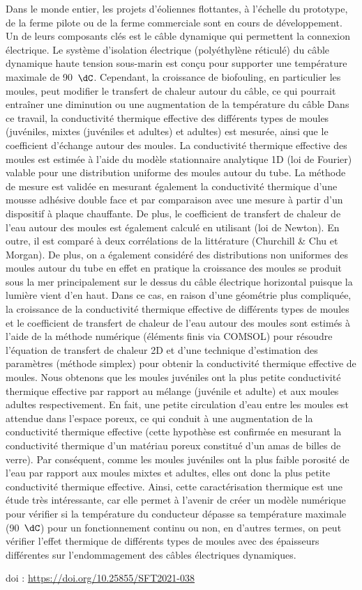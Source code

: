 {\normalsize
Dans le monde entier, les projets d'éoliennes flottantes, à l'échelle du prototype, de la ferme pilote ou de la ferme commerciale sont en cours de développement. Un de leurs composants clés est le câble dynamique qui permettent la connexion électrique. Le système d'isolation électrique (polyéthylène réticulé) du câble dynamique haute tension sous-marin est conçu pour supporter une température maximale de 90~$\dC$. Cependant, la croissance de biofouling, en particulier les moules, peut modifier le transfert de chaleur autour du câble, ce qui pourrait entraîner une diminution ou une augmentation de la température du câble Dans ce travail, la conductivité thermique effective des différents types de moules (juvéniles, mixtes (juvéniles et adultes) et adultes) est mesurée, ainsi que le coefficient d'échange autour des moules. La conductivité thermique effective des moules est estimée à l'aide du modèle stationnaire analytique 1D (loi de Fourier) valable pour une distribution uniforme des moules autour du tube. La méthode de mesure est validée en mesurant également la conductivité thermique d'une mousse adhésive double face et par comparaison avec une mesure à partir d'un dispositif à plaque chauffante. De plus, le coefficient de transfert de chaleur de l'eau autour des moules est également calculé en utilisant (loi de Newton). En outre, il est comparé à deux corrélations de la littérature (Churchill \& Chu et Morgan). De plus, on a également considéré des distributions non uniformes des moules autour du tube en effet en pratique la croissance des moules se produit sous la mer principalement sur le dessus du câble électrique horizontal puisque la lumière vient d'en haut. Dans ce cas, en raison d'une géométrie plus compliquée, la croissance de la conductivité thermique effective de différents types de moules et le coefficient de transfert de chaleur de l'eau autour des moules sont estimés à l'aide de la méthode numérique (éléments finis via COMSOL) pour résoudre l'équation de transfert de chaleur 2D et d'une technique d'estimation des paramètres (méthode simplex) pour obtenir la conductivité thermique effective de moules. Nous obtenons que les moules juvéniles ont la plus petite conductivité thermique effective par rapport au mélange (juvénile et adulte) et aux moules adultes respectivement. En fait, une petite circulation d'eau entre les moules est attendue dans l'espace poreux, ce qui conduit à une augmentation de la conductivité thermique effective (cette hypothèse est confirmée en mesurant la conductivité thermique d'un matériau poreux constitué d'un amas de billes de verre). Par conséquent, comme les moules juvéniles ont la plus faible porosité de l'eau par rapport aux moules mixtes et adultes, elles ont donc la plus petite conductivité thermique effective. Ainsi, cette caractérisation thermique est une étude très intéressante, car elle permet à l'avenir de créer un modèle numérique pour vérifier si la température du conducteur dépasse sa température maximale (90~$\dC$) pour un fonctionnement continu ou non, en d'autres termes, on peut vérifier l'effet thermique de différents types de moules avec des épaisseurs différentes sur l'endommagement des câbles électriques dynamiques.

 \vfill doi : \url{https://doi.org/10.25855/SFT2021-038}

}
 
